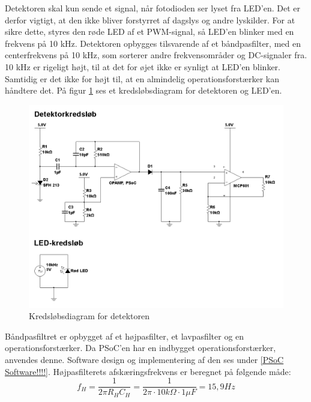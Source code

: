 Detektoren skal kun sende et signal, når fotodioden ser lyset fra LED'en. Det er derfor vigtigt, at den ikke bliver forstyrret af dagslys og andre lyskilder. For at sikre dette, styres den røde LED af et PWM-signal, så LED'en blinker med en frekvens på 10 kHz. Detektoren opbygges tilsvarende af et båndpasfilter, med en centerfrekvens på 10 kHz, som sorterer andre frekvensområder og DC-signaler fra. 10 kHz er rigeligt højt, til at det for øjet ikke er synligt at LED'en blinker. Samtidig er det ikke for højt til, at en almindelig operationsforstærker kan håndtere det. På figur \ref*{fig:detektortand} ses et kredsløbsdiagram for detektoren og LED'en.

\begin{figure}[H]
	\centering
	\includegraphics[width=\textwidth]{Afsnit/DesignOgImplementering/images/detektor_tandhjul}
	\caption{Kredsløbsdiagram for detektoren}
	\label{fig:detektortand}
\end{figure}

Båndpasfiltret er opbygget af et højpasfilter, et lavpasfilter og en operationsforstærker. Da PSoC'en har en indbygget operationsforstærker, anvendes denne. Software design og implementering af den ses under \ref{PSoC Software!!!!}. Højpasfilterets afskæringsfrekvens er beregnet på følgende måde: \\

\begin{equation}
	f_{H}=\frac{1}{2\pi R_{H} C_{H}}=\frac{1}{2\pi \cdot 10k\Omega \cdot 1\mu F}=15,9Hz
	\label{cutoffhojpas}
\end{equation} \\

